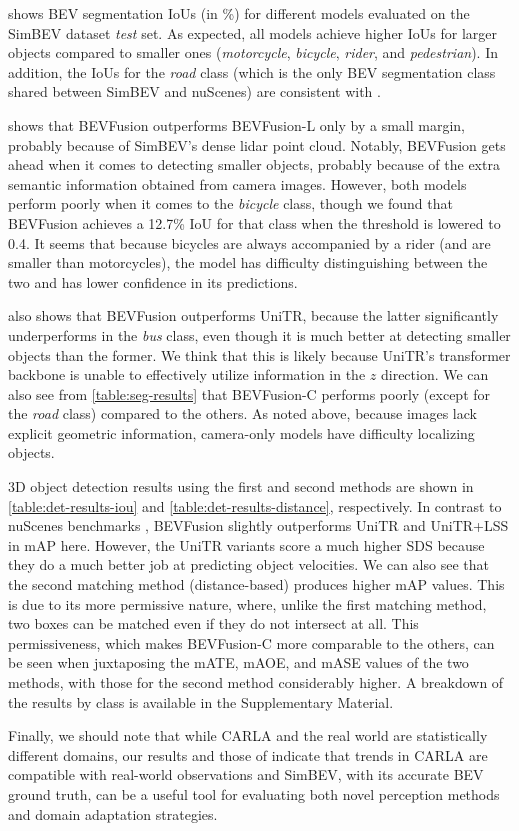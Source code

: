  shows BEV segmentation IoUs (in \%) for different models evaluated on the SimBEV dataset \textit{test} set. As expected, all models achieve higher IoUs for larger objects compared to smaller ones (\textit{motorcycle}, \textit{bicycle}, \textit{rider}, and \textit{pedestrian}). In addition, the IoUs for the \textit{road} class (which is the only BEV segmentation class shared between SimBEV and nuScenes) are consistent with \cite{liu2022bevfusion}.

 shows that BEVFusion outperforms BEVFusion-L only by a small margin, probably because of SimBEV's dense lidar point cloud. Notably, BEVFusion gets ahead when it comes to detecting smaller objects, probably because of the extra semantic information obtained from camera images. However, both models perform poorly when it comes to the \textit{bicycle} class, though we found that BEVFusion achieves a 12.7\% IoU for that class when the threshold is lowered to 0.4. It seems that because bicycles are always accompanied by a rider (and are smaller than motorcycles), the model has difficulty distinguishing between the two and has lower confidence in its predictions.

 also shows that BEVFusion outperforms UniTR, because the latter significantly underperforms in the \textit{bus} class, even though it is much better at detecting smaller objects than the former. We think that this is likely because UniTR's transformer backbone is unable to effectively utilize information in the $z$ direction. We can also see from \cref{table:seg-results} that BEVFusion-C performs poorly (except for the \textit{road} class) compared to the others. As noted above, because images lack explicit geometric information, camera-only models have difficulty localizing objects.

3D object detection results using the first and second methods are shown in \cref{table:det-results-iou} and \cref{table:det-results-distance}, respectively. In contrast to nuScenes benchmarks \cite{caesar2020nuscenes, wang2023unitr}, BEVFusion slightly outperforms UniTR and UniTR+LSS in mAP here. However, the UniTR variants score a much higher SDS because they do a much better job at predicting object velocities. We can also see that the second matching method (distance-based) produces higher mAP values. This is due to its more permissive nature, where, unlike the first matching method, two boxes can be matched even if they do not intersect at all. This permissiveness, which makes BEVFusion-C more comparable to the others, can be seen when juxtaposing the mATE, mAOE, and mASE values of the two methods, with those for the second method considerably higher. A breakdown of the results by class is available in the Supplementary Material.

Finally, we should note that while CARLA and the real world are statistically different domains, our results and those of \cite{sun2022shift} indicate that trends in CARLA are compatible with real-world observations and SimBEV, with its accurate BEV ground truth, can be a useful tool for evaluating both novel perception methods and domain adaptation strategies.


